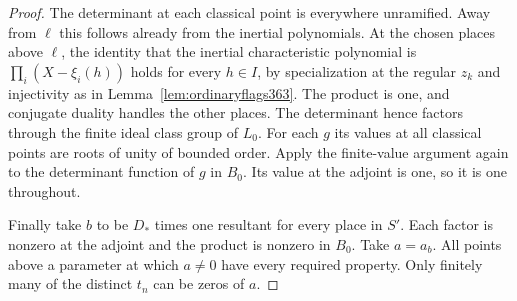 \documentclass[a4paper,11pt]{article}
\theoremstyle{definition}
\theoremstyle{remark}
\numberwithin{equation}{section}
\begin{document}
\begin{proof}
The determinant at each classical point is everywhere
unramified. Away from \(\ell\) this follows already from the
inertial polynomials. At the chosen places above \(\ell\),
the identity that the inertial characteristic polynomial is
\(\prod_i(X-\xi_i(h))\) holds for every \(h\in I\), by
specialization at the regular \(z_k\) and injectivity as in
Lemma~\ref{lem:ordinaryflags363}. The product is one, and
conjugate duality handles the other places. The determinant
hence factors through the finite ideal class group of \(L_0\).
For each \(g\) its values at all classical points are roots
of unity of bounded order. Apply the finite-value argument
again to the determinant function of \(g\) in \(B_0\).
Its value at the adjoint is one, so it is one throughout.

Finally take \(b\) to be \(D_*\) times one resultant for every
place in \(S'\). Each factor is nonzero at the adjoint and the
product is nonzero in \(B_0\). Take \(a=a_b\). All points above
a parameter at which \(a\ne0\) have every required property.
Only finitely many of the distinct \(t_n\) can be zeros of \(a\).
\end{proof}
\end{document}
